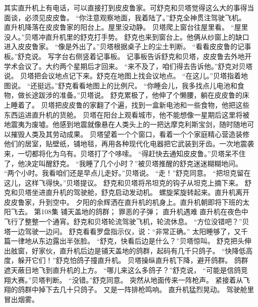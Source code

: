 \documentclass[a4paper,12pt,UTF8,twoside]{ctexbook}
\begin{document}
        其实直升机上有电话，可以直接打到皮皮鲁家。可舒克和贝塔觉得这么大的事得当面谈，必须见皮皮鲁。 
        “你注意观察地面，我着陆了。”舒克全神贯注驾驶飞机。 
        直升机降落在皮皮鲁家的阳台上。屋里没动静。 
        贝塔爬上窗台往屋里看。 
        “屋里没人。”贝塔冲直升机里的舒克打手势。 
        舒克也来到窗台上。他俩从纱窗上的缺口进入皮皮鲁家。 
        “像是外出了。”贝塔根据桌子上的尘土判断。 
        “看看皮皮鲁的记事板。”舒克说。 
        写字台右侧竖着记事板。 
        记事板告诉舒克和贝塔，皮皮鲁去外地开学术会议了。大约两个星期后才回来。 
        “来不及了，咱们得去告诉他。”舒克对贝塔说。 
        贝塔把会议地点记下来。舒克在地图上找会议地点。 
        “在这儿。”贝塔指着地图说。 
        “还挺远。”舒克看看地图上的比例尺。 
        “你睡会儿，我多找点儿电池和食物，做长途跋涉的准备。”贝塔说。 
        舒克累极了，他伸了个懒腰，躺在皮皮鲁的床上睡着了。 
        贝塔把皮皮鲁的家翻了个遍，找到一盒新电池和一些食物，他把这些东西运进直升机的货舱。 
        贝塔在阳台上观看城市，他不能想像一星期后这里将被地震夷为废墟。他感到地震就像悬在人类头上的一把达摩克利斯宝剑，随时随地可以摧毁人类及其劳动成果。 
        贝塔望着一个个窗口，看着一个个家庭精心营造装修他们的居室，贴壁纸，铺地毯，再用各种现代化电器把它武装到牙齿。一次地震袭来，一切都将化为乌有。贝塔打了个哆嗦。 
        “得赶快去通知皮皮鲁。”贝塔呆不住了，他决定叫醒舒克。 
        “我睡了几个小时？”被贝塔推醒的舒克迷迷糊糊地问。 
        “两个小时。我看咱们还是早点儿走好。”贝塔说。 
        “走！”舒克同意。 
        “把坦克留在这儿，这样飞得快。”贝塔提议。 
        舒克和贝塔将吊坦克的钩子从坦克上摘下来。 
        舒克和贝塔坐进直升机的驾驶舱，舒克启动发动机。 
        螺旋桨旋转起来。直升机离开皮皮鲁家，升到空中。 
        夕阳的余辉洒在直升机的机身上。直升机朝即将下班的太阳飞去。   第108集 
        铺天盖地的鸽群； 
        罪恶的子弹； 
        直升机遇难   
        直升机在夜色中飞行了整整一个通宵。舒克和贝塔轮流驾驶飞机，轮流休息。 
        “方位没错吧？”贝塔一边驾驶一边问。 
        舒克看看罗盘指示仪，说：“非常正确。” 
        太阳睡够了，又千篇一律地从东边露出半张脸。 
        “舒克，快看后边是什么？”贝塔惊叫。 
        舒克把头伸出舷窗，好家伙，直升机后边是铺天盖地的鸽群，起码有几千只鸽子。 
        “快降低高度，躲开它们！”舒克怕鸽子撞直升机。 
        贝塔操纵直升机下降，避开鸽群。 
        鸽群遮天蔽日地飞到直升机的上方。 
        “哪儿来这么多鸽子？”舒克说， 
        “可能是信鸽竞翔大赛。”贝塔判断。 
        “没错。”舒克同意。 
        突然从地面传来一阵枪声。 
        紧接着从飞翔的鸽群中掉下去几十只鸽子。 
        又是一阵排枪鸣响。 
        直升机猛烈晃动。 
        驾驶舱里冒出烟雾。 
\end{document}
